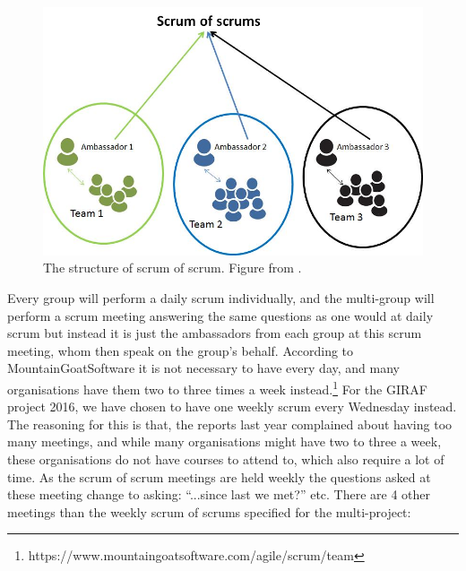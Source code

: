 \begin{figure}
\centering
\includegraphics[scale=0.4]{figures/scrumofscrum.png}
\caption{The structure of scrum of scrum. Figure from \cite{scrumofscrumfigure}.}
\label{fig:scrumofscrum}
\end{figure}

Every group will perform a daily scrum individually, and the multi-group will perform a scrum meeting answering the same questions as one would at daily scrum but instead it is just the ambassadors from each group at this scrum meeting, whom then speak on the group's behalf.
According to MountainGoatSoftware it is not necessary to have every day, and many organisations have them two to three times a week instead.\footnote{https://www.mountaingoatsoftware.com/agile/scrum/team}
For the GIRAF project 2016, we have chosen to have one weekly scrum every Wednesday instead.
The reasoning for this is that, the reports last year complained about having too many meetings, and while many organisations might have two to three a week, these organisations do not have courses to attend to, which also require a lot of time.
As the scrum of scrum meetings are held weekly the questions asked at these meeting change to asking: ``...since last we met?'' etc.
There are 4 other meetings than the weekly scrum of scrums specified for the multi-project:

